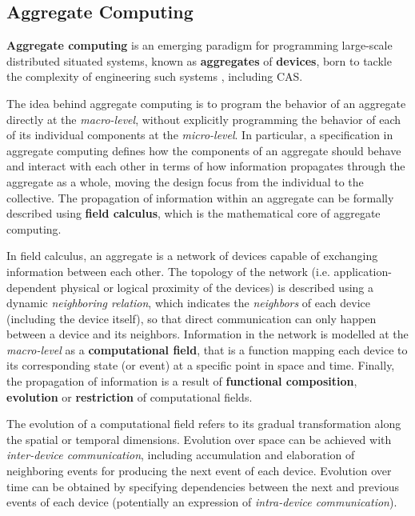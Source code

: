 
\subsection{Aggregate Computing}

\textbf{Aggregate computing} is an emerging paradigm for programming large-scale
distributed situated systems, known as \textbf{aggregates} of \textbf{devices},
born to tackle the complexity of engineering such systems
\cite{FieldCalculus-AggregateComputing}, including \ac{CAS}.

The idea behind aggregate computing is to program the behavior of an aggregate
directly at the \textit{macro-level}, without explicitly programming the
behavior of each of its individual components at the \textit{micro-level}. In
particular, a specification in aggregate computing defines how the components
of an aggregate should behave and interact with each other in terms of how
information propagates through the aggregate as a whole, moving the design
focus from the individual to the collective. The propagation of information
within an aggregate can be formally described using \textbf{field calculus},
which is the mathematical core of aggregate computing.

In field calculus, an aggregate is a network of devices capable of exchanging
information between each other. The topology of the network (i.e.
application-dependent physical or logical proximity of the devices) is
described using a dynamic \textit{neighboring relation}, which indicates the
\textit{neighbors} of each device (including the device itself), so that direct
communication can only happen between a device and its neighbors. Information
in the network is modelled at the \textit{macro-level} as a
\textbf{computational field}, that is a function mapping each device to its
corresponding state (or event) at a specific point in space and time. Finally,
the propagation of information is a result of \textbf{functional composition},
\textbf{evolution} or \textbf{restriction} of computational fields.

The evolution of a computational field refers to its gradual transformation
along the spatial or temporal dimensions. Evolution over space can be achieved
with \textit{inter-device communication}, including accumulation and
elaboration of neighboring events for producing the next event of each device.
Evolution over time can be obtained by specifying dependencies between the next
and previous events of each device (potentially an expression of
\textit{intra-device communication}).

